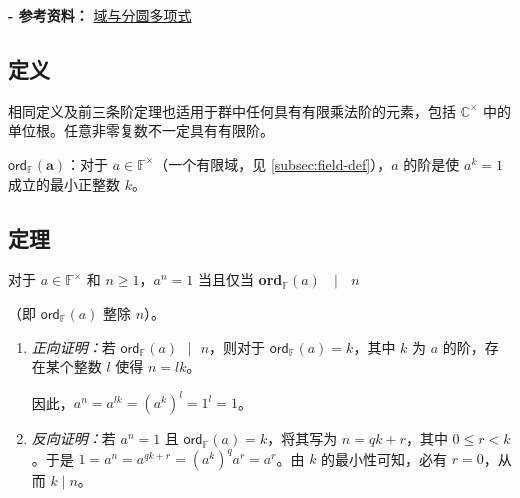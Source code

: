 \textbf{- 参考资料：}
\href{https://e.math.cornell.edu/people/belk/numbertheory/CyclotomicPolynomials.pdf}{域与分圆多项式}~\cite{cyclotomic-polynomial}

\subsection{定义}
\label{subsec:order-def}

相同定义及前三条阶定理也适用于群中任何具有有限乘法阶的元素，包括 $\mathbb{C}^{\times}$ 中的单位根。任意非零复数不一定具有有限阶。

\begin{tcolorbox}[title={\textbf{\tboxdef{\ref*{subsec:order-def}} 阶的定义}}]
$\bm{\textsf{ord}_{\mathbb{F}}(a)}$：对于 $a \in \mathbb{F}^{\times}$（一个有限域，见 \autoref{subsec:field-def}），$a$ 的阶是使 $a^k = 1$ 成立的最小正整数 $k$。
\end{tcolorbox}

\subsection{定理}
\label{subsec:order-theorem}



\begin{tcolorbox}[title={\textbf{\tboxtheorem{\ref*{subsec:order-theorem}.1} 阶的性质（I）}}]
对于 $a \in \mathbb{F}^{\times}$ 和 $n \geq 1$，$a^n = 1$ 当且仅当 \textbf{\textsf{ord}}$_{\mathbb{F}}(a) \text{ } \mid \text{ } n$

（即 $\textsf{ord}_{\mathbb{F}}(a)$ 整除 $n$）。
\end{tcolorbox}

\begin{myproof}
    \begin{enumerate}
    \item \textit{正向证明：}若 $\textsf{ord}_{\mathbb{F}}(a) \text{ } | \text{ } n$，则对于 $\textsf{ord}_{\mathbb{F}}(a) = k$，其中 $k$ 为 $a$ 的阶，存在某个整数 $l$ 使得 $n = lk$。
    
    因此，$a^n = a^{lk} = (a^k)^l = 1^l = 1$。
    \item \textit{反向证明：}若 $a^n = 1$ 且 $\textsf{ord}_{\mathbb{F}}(a)=k$，将其写为 $n=qk+r$，其中 $0 \le r < k$。于是 $1=a^n=a^{qk+r}=(a^k)^q a^r=a^r$。由 $k$ 的最小性可知，必有 $r=0$，从而 $k \mid n$。
    \end{enumerate}
\end{myproof}


